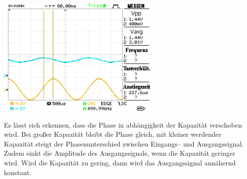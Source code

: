 \documentclass[10pt]{article}
\newenvironment{Figure}
  {\par\medskip\noindent\minipage{\linewidth}}
  {\endminipage\par\medskip}
\begin{document}
\begin{multicols}{2}
\begin{Figure}
        \end{Figure}
        \begin{Figure}
                \centering
                \includegraphics[width=0.6\textwidth]{../data/DS0009.png}
        \end{Figure}
        Es lässt sich erkennen, dass die Phase in abhängigkeit der Kapazität verschoben wird.
        Bei großer Kapazität bleibt die Phase gleich, mit kleiner werdender Kapazität steigt der Phasenunterschied zwischen Eingangs-- und Ausgangssignal.
        Zudem sinkt die Amplitude des Ausgangssignals, wenn die Kapazität geringer wird.
        Wird die Kapazität zu gering, dann wird das Ausgangssignal annähernd konstant.


\end{multicols}
\end{document}
